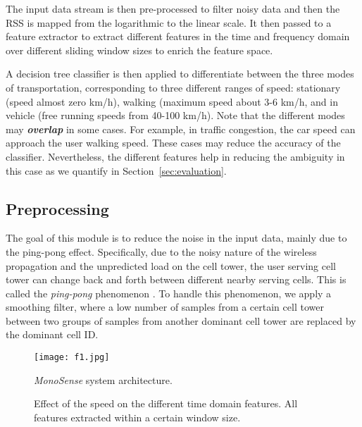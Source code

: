 \documentclass[conference]{IEEEtran}
\def \sys {\textit{MonoSense}}
\begin{document}
The input data stream is then pre-processed to filter noisy data and then the RSS is mapped from the logarithmic to the linear scale. It then passed to a feature extractor to extract different features in the time and frequency domain over different sliding window sizes to enrich the feature space.

A decision tree classifier is then applied to differentiate between the three modes of transportation, corresponding to three different ranges of speed: stationary (speed almost zero km/h), walking (maximum speed about 3-6 km/h, and in vehicle (free running speeds from 40-100 km/h). Note that the different modes may \textbf{\emph{overlap}} in some cases. For example, in traffic congestion, the car speed can approach the user walking speed. These cases may reduce the accuracy of the classifier. Nevertheless, the different features help in reducing the ambiguity in this case as we quantify in Section~\ref{sec:evaluation}.


\subsection{Preprocessing}\label{Preprocessing}
The goal of this module is to reduce the noise in the input data, mainly due to the ping-pong effect. Specifically, due to the noisy nature of the wireless propagation and the unpredicted load on the cell tower, the user serving cell tower can change back and forth between different nearby serving cells. This is called the \emph{ping-pong} phenomenon \cite{henderson2008changing,song2004evaluating}. To handle this phenomenon, we apply a smoothing filter, where a low number of samples from a certain cell tower between two groups of samples from another dominant cell tower are replaced by the dominant cell ID. 

\begin{figure}[!t]
	\centering
		\texttt{[image: f1.jpg]}
	\caption{\sys{} system architecture.}
	\label{fig:Arc}
\end{figure}

											
\begin{figure*}[!t]
  \centering

		\caption{Effect of the speed on the different time domain features. All features extracted within a certain window size.}
\label{fig:basic_oper}
\end{figure*}
\end{document}
